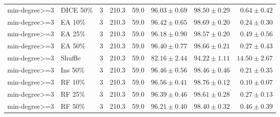 {\begin{longtable}{llrrrrrr}
min-degree>=3 & DICE 50\% & 3 & 210.3 & 59.0 & $96.03\pm0.69$ & $98.50\pm0.29$ & $0.64\pm0.42$ \\
min-degree>=3 & EA 10\% & 3 & 210.3 & 59.0 & $96.42\pm0.65$ & $98.69\pm0.20$ & $0.24\pm0.30$ \\
min-degree>=3 & EA 25\% & 3 & 210.3 & 59.0 & $96.18\pm0.90$ & $98.57\pm0.20$ & $0.49\pm0.56$ \\
min-degree>=3 & EA 50\% & 3 & 210.3 & 59.0 & $96.40\pm0.77$ & $98.66\pm0.21$ & $0.27\pm0.43$ \\
min-degree>=3 & Shuffle & 3 & 210.3 & 59.0 & $82.16\pm2.44$ & $94.22\pm1.11$ & $14.50\pm2.67$ \\
min-degree>=3 & Ins 50\% & 3 & 210.3 & 59.0 & $96.46\pm0.56$ & $98.46\pm0.46$ & $0.21\pm0.35$ \\
min-degree>=3 & RF 10\% & 3 & 210.3 & 59.0 & $96.56\pm0.41$ & $98.76\pm0.12$ & $0.10\pm0.07$ \\
min-degree>=3 & RF 25\% & 3 & 210.3 & 59.0 & $96.39\pm0.46$ & $98.61\pm0.28$ & $0.27\pm0.13$ \\
min-degree>=3 & RF 50\% & 3 & 210.3 & 59.0 & $96.21\pm0.40$ & $98.40\pm0.32$ & $0.46\pm0.39$ \\
\end{longtable}
}
